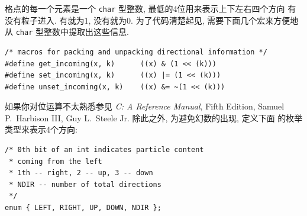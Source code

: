 \documentclass{ctexart}
\begin{document}
格点的每一个元素是一个 \verb|char| 型整数, 最低的4位用来表示上下左右四个方向
有没有粒子进入. 有就为1, 没有就为0. 为了代码清楚起见, 需要下面几个宏来方便地从
\verb|char| 型整数中提取出这些信息.
\begin{verbatim}
/* macros for packing and unpacking directional information */
#define get_incoming(x, k)      ((x) & (1 << (k)))
#define set_incoming(x, k)      ((x) |= (1 << (k)))
#define unset_incoming(x, k)    ((x) &= ~(1 << (k)))
\end{verbatim}
如果你对位运算不太熟悉参见 {\sl C: A Reference Manual}, Fifth Edition, Samuel
P.~Harbison III, Guy L.~Steele Jr. 除此之外, 为避免幻数的出现, 定义下面
的枚举类型来表示4个方向:
\begin{verbatim}
/* 0th bit of an int indicates particle content
 * coming from the left
 * 1th -- right, 2 -- up, 3 -- down
 * NDIR -- number of total directions
 */
enum { LEFT, RIGHT, UP, DOWN, NDIR };
\end{verbatim}
\end{document}
